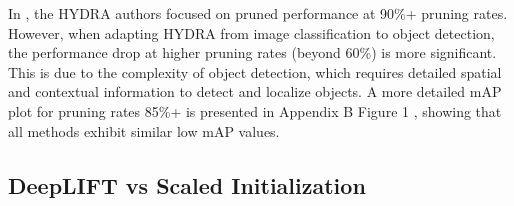 \documentclass[10pt]{cai}
\begin{document}
In \cite{hydra}, the HYDRA authors focused on pruned performance at 90\%+ pruning rates. However, when adapting HYDRA from image classification to object detection, the performance drop at higher pruning rates (beyond 60\%) is more significant. This is due to the complexity of object detection, which requires detailed spatial and contextual information to detect and localize objects. A more detailed mAP plot for pruning rates 85\%+ is presented in Appendix B Figure 1 \cite{MyAppendix}, showing that all methods exhibit similar low mAP values.

\subsection{DeepLIFT vs Scaled Initialization}
\label{sec1}
\end{document}
